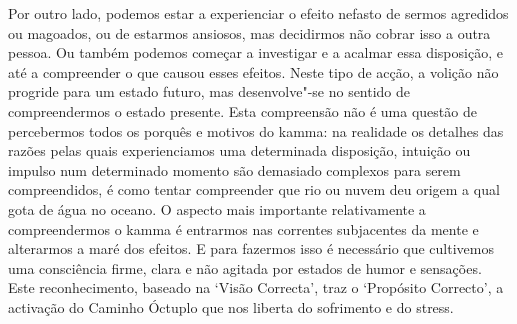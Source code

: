 Por outro lado, podemos estar a experienciar o efeito nefasto de sermos
agredidos ou magoados, ou de estarmos ansiosos, mas decidirmos não cobrar isso a
outra pessoa. Ou também podemos começar a investigar e a acalmar essa
disposição, e até a compreender o que causou esses efeitos. Neste tipo de acção,
a volição não progride para um estado futuro, mas desenvolve"-se no sentido de
compreendermos o estado presente. Esta compreensão não é uma questão de
percebermos todos os porquês e motivos do kamma: na realidade os detalhes das
razões pelas quais experienciamos uma determinada disposição, intuição ou
impulso num determinado momento são demasiado complexos para serem
compreendidos, é como tentar compreender que rio ou nuvem deu origem a qual gota
de água no oceano.
O aspecto mais importante relativamente a compreendermos o kamma é
entrarmos nas correntes subjacentes da mente e alterarmos a maré dos efeitos. E
para fazermos isso é necessário que cultivemos uma consciência firme, clara e
não agitada por estados de humor e sensações. Este reconhecimento, baseado na
`Visão Correcta', traz o `Propósito Correcto', a activação do Caminho Óctuplo
que nos liberta do sofrimento e do stress.

